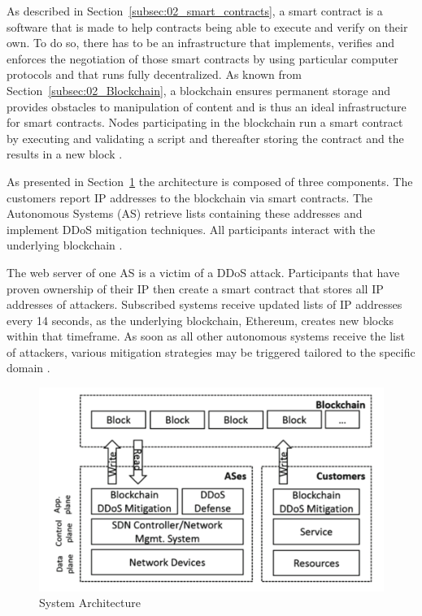 As described in Section~\ref{subsec:02_smart_contracts}, a smart contract is a software that is made to help contracts being able to execute and verify on their own. To do so, there has to be an infrastructure that implements, verifies and enforces the negotiation of those smart contracts by using particular computer protocols and that runs fully decentralized. As known from Section~\ref{subsec:02_Blockchain}, a blockchain ensures permanent storage and provides obstacles to manipulation of content and is thus an ideal infrastructure for smart contracts. Nodes participating in the blockchain run a smart contract by executing and validating a script and thereafter storing the contract and the results in a new block \cite{Rodrigues2017}.

As presented in Section~\ref{system_architecture} the architecture is composed of three components. The customers report IP addresses to the blockchain via smart contracts. The Autonomous Systems (AS) retrieve lists containing these addresses and implement DDoS mitigation techniques. All participants interact with the underlying blockchain \cite{Rodrigues2017}.

The web server of one AS is a victim of a DDoS attack. Participants that have proven ownership of their IP then create a smart contract that stores all IP addresses of attackers. Subscribed systems receive updated lists of IP addresses every 14 seconds, as the underlying blockchain, Ethereum, creates new blocks within that timeframe. As soon as all other autonomous systems receive the list of attackers, various mitigation strategies may be triggered tailored to the specific domain \cite{Rodrigues2017}.
\begin{figure}[ht]
  \begin{center}
    \includegraphics[scale=0.6]{Talk7/img/ddos/collaborative_ddos_mitigation_system_architecture}
  \end{center}
  \caption{System Architecture}
  \label{system_architecture}
\end{figure}

